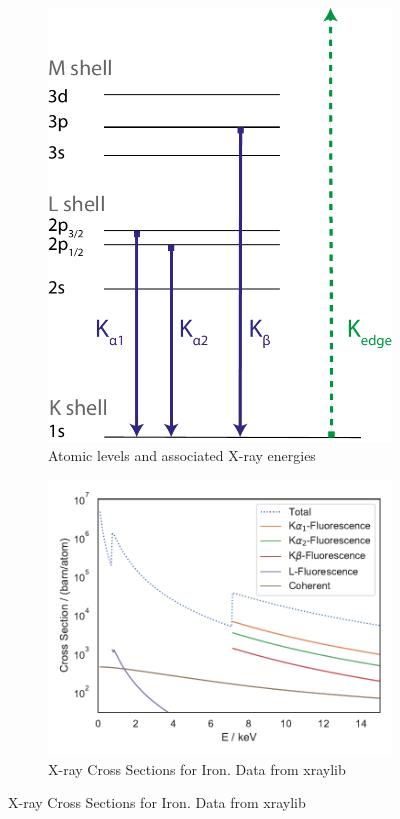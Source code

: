 \begin{figure}
	\centering
	\begin{subfigure}[b]{0.35\textwidth}
		\includegraphics[width=\linewidth]{images/levels.pdf}
		\caption[Atomic Levels]{Atomic levels and associated X\nobreakdash-ray energies}
		\label{fig:levels}
	\end{subfigure}
	\begin{subfigure}[b]{0.45\textwidth}
		\includegraphics[width=\linewidth]{images/crosssectionFe.pdf}
		\caption[Cross Sections]{X-ray Cross Sections for Iron. Data from xraylib \cite{xraylib}}
		\label{fig:cross}
	\end{subfigure}
\end{figure}


